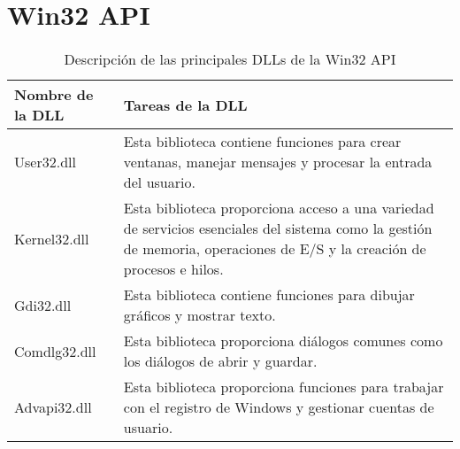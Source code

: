 \section{Win32 API}

\begin{table}[h!]
\centering
\begin{tabular}{|l|p{10cm}|}
\hline
\textbf{Nombre de la DLL} & \textbf{Tareas de la DLL} \\
\hline
User32.dll & Esta biblioteca contiene funciones para crear ventanas, manejar mensajes y procesar la entrada del usuario. \\
\hline
Kernel32.dll & Esta biblioteca proporciona acceso a una variedad de servicios esenciales del sistema como la gestión de memoria, operaciones de E/S y la creación de procesos e hilos. \\
\hline
Gdi32.dll & Esta biblioteca contiene funciones para dibujar gráficos y mostrar texto. \\
\hline
Comdlg32.dll & Esta biblioteca proporciona diálogos comunes como los diálogos de abrir y guardar. \\
\hline
Advapi32.dll & Esta biblioteca proporciona funciones para trabajar con el registro de Windows y gestionar cuentas de usuario. \\
\hline
\end{tabular}
\caption{Descripción de las principales DLLs de la Win32 API}
\end{table}